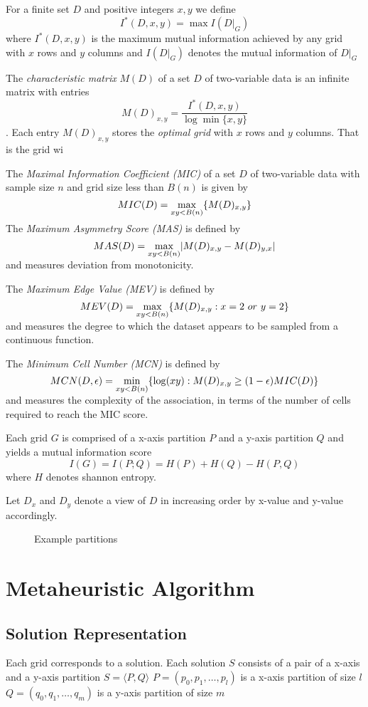 \documentclass[12pt]{article}
\begin{document}
For a finite set $D$ and positive integers $x,y$ we define $$I^*(D,x,y)=\max I(D|_G)$$
where $I^*(D,x,y)$ is the maximum mutual information achieved by any grid with $x$ rows and $y$ columns and $I(D|_G)$ denotes the mutual information of $D|_G$

The {\it characteristic matrix} $M(D)$ of a set $D$ of two-variable data is an infinite matrix with entries $$M(D)_{x,y}=\frac{I^*(D,x,y)}{\log \min\{x,y\}}$$.
Each entry $M(D)_{x,y}$ stores the {\it optimal grid} with $x$ rows and $y$ columns. That is the grid wi

The {\it Maximal Information Coefficient (MIC)} of a set $D$ of two-variable data with sample size $n$ and grid size less than $B(n)$ is given by
$$MIC(D)=\smash{\displaystyle\max_{xy<B(n)}} \{M(D)_{x,y}\}$$

The {\it Maximum Asymmetry Score (MAS)} is defined by $$MAS(D)=\smash{\displaystyle\max_{xy<B(n)}} |M(D)_{x,y}-M(D)_{y,x}|$$
and measures deviation from monotonicity.

The {\it Maximum Edge Value (MEV)} is defined by $$MEV(D)=\smash{\displaystyle\max_{xy<B(n)}} \{M(D)_{x,y}:x=2\ or\ y=2\}$$
and measures the degree to which the dataset appears to be sampled from a continuous function.

The {\it Minimum Cell Number (MCN)} is defined by $$MCN(D,\epsilon)=\smash{\displaystyle\min_{xy<B(n)}} \{\log(xy):M(D)_{x,y}\geq(1-\epsilon)MIC(D)\}$$
and measures the complexity of the association, in terms of the number of cells required to reach the MIC score.

Each grid $G$ is comprised of a x-axis partition $P$ and a y-axis partition $Q$
and yields a mutual information score $$I(G)=I(P;Q)=H(P)+H(Q)-H(P,Q)$$ where $H$ denotes shannon entropy.

Let $D_x$ and $D_y$ denote a view of $D$ in increasing order by x-value and y-value accordingly.

\begin{figure}
  \caption{Example partitions}
  \label{fig:example_grid}
\end{figure}



\section{Metaheuristic Algorithm}
\label{sec:algorithm}
\subsection{Solution Representation}
Each grid corresponds to a solution.
Each solution $S$ consists of a pair of a x-axis and a y-axis partition $S=\langle P, Q \rangle$
$P=(p_0,p_1,\ldots,p_l)$ is a x-axis partition of size $l$
$Q=(q_0,q_1,\ldots,q_m)$ is a y-axis partition of size $m$
\end{document}
